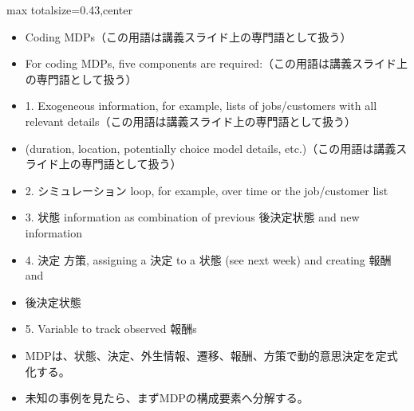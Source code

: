 \clearpage
{}
\begin{minipage}[t]{0.405\textwidth}
\begin{adjustbox}{max totalsize={\textwidth}{0.43\textheight},center}
\begin{minipage}{\textwidth}\scriptsize
{}\begin{itemize}
\item Coding MDPs（この用語は講義スライド上の専門語として扱う）
\item For coding MDPs, five components are required:（この用語は講義スライド上の専門語として扱う）
\item 1. Exogeneous information, for example, lists of jobs/customers with all relevant details（この用語は講義スライド上の専門語として扱う）
\item (duration, location, potentially choice model details, etc.)（この用語は講義スライド上の専門語として扱う）
\item 2. シミュレーション loop, for example, over time or the job/customer list
\item 3. 状態 information as combination of previous 後決定状態 and new information
\item 4. 決定 方策, assigning a 決定 to a 状態 (see next week) and creating 報酬 and
\item 後決定状態
\item 5. Variable to track observed 報酬s
\end{itemize}\begin{itemize}
\item MDPは、状態、決定、外生情報、遷移、報酬、方策で動的意思決定を定式化する。
\item 未知の事例を見たら、まずMDPの構成要素へ分解する。
\end{itemize}
\end{minipage}
\end{adjustbox}
\end{minipage}\hfill
